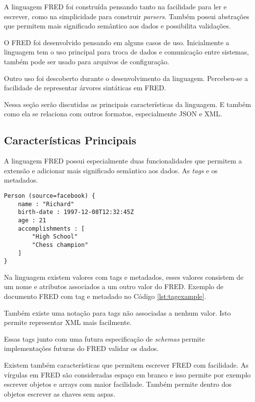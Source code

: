 A linguagem FRED foi construída pensando tanto na facilidade para ler e escrever, como na
simplicidade para construir \textit{parsers}. Também possui abstrações que permitem 
mais significado semântico aos dados e possibilita validações. 

O FRED foi desenvolvido pensando em alguns casos de uso. Inicialmente a linguagem
tem o uso principal para troca de dados e comunicação entre sistemas, também pode
ser usado para arquivos de configuração. 

Outro uso foi descoberto durante o desenvolvimento da linguagem. 
Percebeu-se a facilidade de representar árvores sintáticas em FRED.

Nessa seção serão discutidas as principais características da linguagem. E também como ela 
se relaciona com outros formatos, especialmente JSON e XML.

\subsection{Características Principais}

A linguagem FRED possui especialmente duas funcionalidades que permitem
a extensão e adicionar mais significado semântico aos dados. As \textit{tags}
e os metadados.

\begin{lstlisting}[caption=Exemplo de Valor FRED com Tag e metadado,label={lst:tagexample}]
Person (source=facebook) {
    name : "Richard"
    birth-date : 1997-12-08T12:32:45Z
    age : 21
    accomplishments : [
        "High School"
        "Chess champion"
    ]
}
\end{lstlisting}
    
Na linguagem existem valores com tags e metadados, esses valores consistem de um nome
e atributos associados a um outro valor do FRED. Exemplo de documento FRED com tag e metadado 
no Código \ref{lst:tagexample}.

Também existe uma notação para tags não associadas a nenhum valor. Isto permite representar
XML mais facilmente.

Essas tags junto com uma futura especificação de \textit{schemas} permite implementações
futuras do FRED validar os dados.

Existem também características que permitem escrever FRED com facilidade. As vírgulas
em FRED são consideradas espaço em branco e isso permite por exemplo escrever objetos
e arrays com maior facilidade. Também permite dentro dos objetos escrever as chaves sem
aspas.


